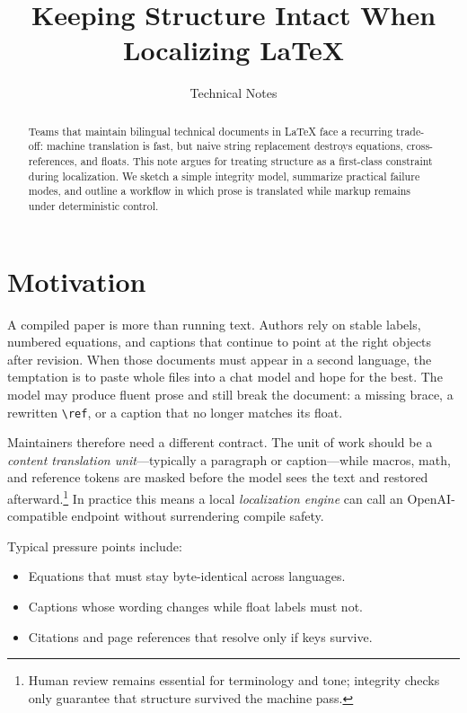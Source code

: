 \documentclass[11pt]{article}
\title{Keeping Structure Intact When Localizing LaTeX}
\author{Technical Notes}
\date{}
\newcommand{\term}[1]{\textit{#1}}
\newcommand{\ctu}{content translation unit}
\newcommand{\toolname}{localization engine}
\begin{document}
\maketitle

\begin{abstract}
Teams that maintain bilingual technical documents in \LaTeX{} face a recurring
trade-off: machine translation is fast, but naive string replacement destroys
equations, cross-references, and floats. This note argues for treating
structure as a first-class constraint during localization. We sketch a
simple integrity model, summarize practical failure modes, and outline a
workflow in which prose is translated while markup remains under
deterministic control.
\end{abstract}

\section{Motivation}
\label{sec:motivation}

A compiled paper is more than running text. Authors rely on stable labels,
numbered equations, and captions that continue to point at the right
objects after revision. When those documents must appear in a second
language, the temptation is to paste whole files into a chat model and hope
for the best. The model may produce fluent prose and still break the
document: a missing brace, a rewritten \texttt{\textbackslash ref}, or a
caption that no longer matches its float.

Maintainers therefore need a different contract. The unit of work should be
a \term{\ctu{}}---typically a paragraph or caption---while macros, math, and
reference tokens are masked before the model sees the text and restored
afterward.\footnote{Human review remains essential for terminology and tone;
integrity checks only guarantee that structure survived the machine pass.}
In practice this means a local \term{\toolname{}} can call an
OpenAI-compatible endpoint without surrendering compile safety.

Typical pressure points include:

\begin{itemize}
  \item Equations that must stay byte-identical across languages.
  \item Captions whose wording changes while float labels must not.
  \item Citations and page references that resolve only if keys survive.
\end{itemize}
\end{document}
